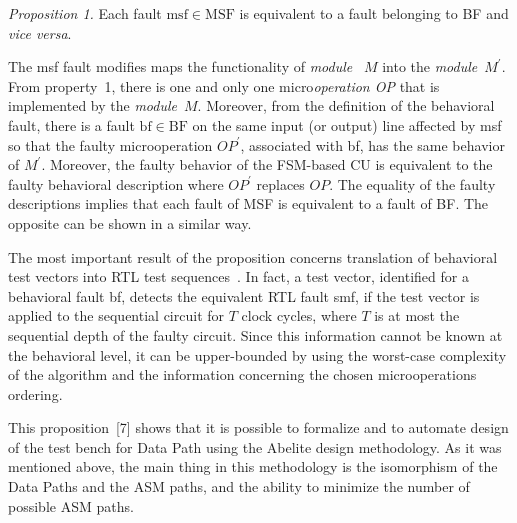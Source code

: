 \begin{multicols}{2}
\medskip
\textit{Proposition 1.} Each fault $\mathrm{msf}\in \mathrm{MSF}$ is equivalent to a fault belonging to BF and \textit{vice
versa}.

   The msf fault modifies maps the functionality of \textit{module }~$M$ into the
\textit{module}~$M^\prime$. From property~1, there is one and only one micro\textit{operation OP} that is
implemented by the \textit{module}~$M$. Moreover, from the definition
of the behavioral fault, there is a fault
$\mathrm{bf} \in \mathrm{BF}$ on the same input (or output) line affected
by msf so that the faulty microoperation $OP^\prime$,
associated with bf, has the same behavior of $M^\prime$. Moreover, the faulty behavior of the FSM-based
CU is equivalent to the faulty behavioral description where $OP^\prime$ replaces $OP$. The equality
of the faulty descriptions implies that each fault of MSF
is equivalent to a fault of BF. The opposite can be
shown in a similar way.

   The most important result of the proposition concerns translation of behavioral test vectors into RTL test
sequences~\cite{7bar}. In fact, a test vector, identified for a behavioral fault bf, detects the equivalent RTL
fault smf, if the test vector is applied to the sequential circuit for $T$ clock cycles, where $T$ is at most the
sequential depth of the faulty circuit. Since this information cannot be known at the behavioral level, it can be
upper-bounded by using the worst-case complexity of the algorithm and the information concerning the chosen
microoperations ordering.

   This proposition~[7] shows that it is possible to formalize and to automate design of the test bench for
Data Path using the Abelite design methodology. As it was mentioned above, the main thing in this
methodology is the isomorphism of the Data Paths and the ASM paths, and the ability to minimize the number
of possible ASM paths.


   
\end{multicols}

